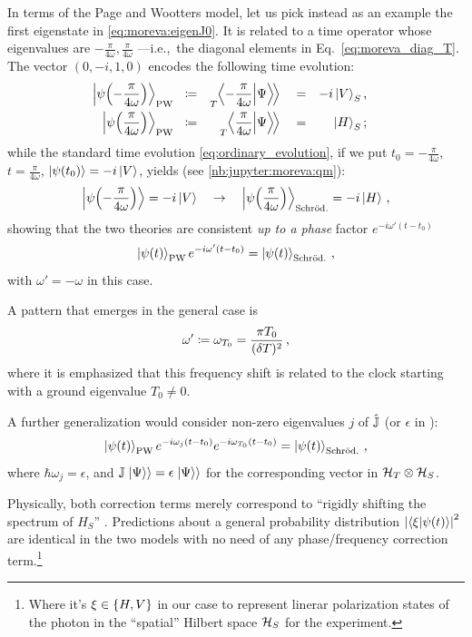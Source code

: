 In terms of the Page and Wootters model,
let us pick instead as an example the first eigenstate in \eqref{eq:moreva:eigenJ0}.
It is related to a time operator whose eigenvalues are
$-\frac{\pi}{4\omega}, \frac{\pi}{4\omega}$
---i.e.,~the diagonal elements in Eq.~\eqref{eq:moreva_diag_T}.
The vector $(0, -i, 1, 0)$ encodes
the following time evolution:
\begin{align}
  \ket{\psi\qty(-\frac{\pi}{4\omega})}_{\mathrm{PW}} \:\:\, &\coloneqq& \prescript{}{T}{\!\left.\left\langle -\frac{\pi}{4\omega} \middle| \Psi \right\rangle\!\right\rangle}&& &=& -i\ket{V}_S&
  \, \text{,} &
  \\
  \ket{\psi\qty( \frac{\pi}{4\omega})}_{\mathrm{PW}} \:\:\, &\coloneqq& \prescript{}{T}{\!\left.\left\langle \frac{\pi}{4\omega} \middle| \Psi \right\rangle\!\right\rangle}&&  &=&   \ket{H}_S&
  \, \text{;} &
\end{align}
while the standard time evolution \eqref{eq:ordinary_evolution}, if we put
$t_0 = -\frac{\pi}{4\omega}$, $t = \frac{\pi}{4\omega}$, $\ket{\psi\qty(t_0)} = -i\ket{V}$,
yields (see \ref{nb:jupyter:moreva:qm}):
\begin{equation}
  \ket{\psi\qty(-\frac{\pi}{4\omega})} = -i\ket{V}
  \quad \rightarrow \quad
  \ket{\psi\qty( \frac{\pi}{4\omega})}_{\mathrm{Schr\ddot{o}d.}} = -i\ket{H}
  \, \text{,}
\end{equation}
showing that the two theories are consistent \emph{up to a phase} factor
$e^{-i\omega'(t - t_{0})}$
\begin{equation}
  \ket{\psi(t)}_{\mathrm{PW}} e^{-i\omega'(t - t_{0})} = \ket{\psi(t)}_{\mathrm{Schr\ddot{o}d.}} \,\text{,}
\end{equation}
with $\omega' = -\omega$ in this case.

A pattern that emerges in the general case is
\[
  \omega' \coloneqq \omega_{T_{0}} = \frac{\pi T_0}{(\delta T)^2} \,\text{,}
\]
where it is emphasized that this frequency shift is related to the clock starting
with a ground eigenvalue $T_0 \ne 0$.

A further generalization would consider non-zero eigenvalues $j$ of $\hat{\mathbb{J}}$
(or $\epsilon$ in \cite[eq. 16]{Lloyd:Time}):
\begin{equation}\label{eq:pw-vs-qm}
  \ket{\psi(t)}_{\mathrm{PW}} e^{-i\omega_{j}(t - t_{0})} e^{-i\omega_{T_0}(t - t_{0})} = \ket{\psi(t)}_{\mathrm{Schr\ddot{o}d.}} \,\text{,}
\end{equation}
where $\hbar\omega_j = \epsilon$,
and $\mathbb{J}\left.\left| \Psi \right\rangle\right\rangle = \epsilon \left.\left| \Psi \right\rangle\right\rangle$
for the corresponding vector in $\mathcal{H}_T \otimes \mathcal{H}_S$.

Physically, both correction terms merely
correspond to ``rigidly shifting the spectrum of $H_S$'' \parencite{Lloyd:Time}.
Predictions about a general probability distribution
$\abs{\braket{\xi}{\psi(t)}}^2$
are identical in the two models with no need of any phase/frequency correction term.\footnote{
  Where it's $\xi \in \qty{H, V}$
  in our case to represent linerar polarization states of the photon in
  the ``spatial'' Hilbert space $\mathcal{H}_S$
  for the experiment.
}

